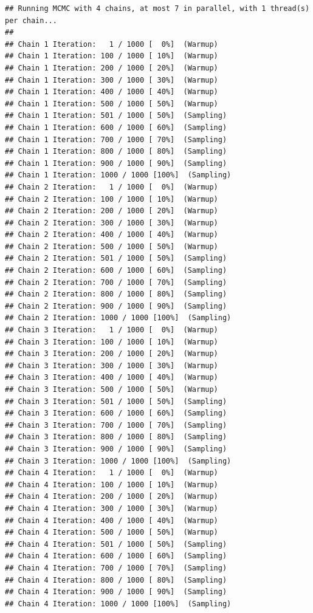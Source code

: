 \documentclass[
]{book}
\begin{document}
\begin{verbatim}
## Running MCMC with 4 chains, at most 7 in parallel, with 1 thread(s) per chain...
## 
## Chain 1 Iteration:   1 / 1000 [  0%]  (Warmup) 
## Chain 1 Iteration: 100 / 1000 [ 10%]  (Warmup) 
## Chain 1 Iteration: 200 / 1000 [ 20%]  (Warmup) 
## Chain 1 Iteration: 300 / 1000 [ 30%]  (Warmup) 
## Chain 1 Iteration: 400 / 1000 [ 40%]  (Warmup) 
## Chain 1 Iteration: 500 / 1000 [ 50%]  (Warmup) 
## Chain 1 Iteration: 501 / 1000 [ 50%]  (Sampling) 
## Chain 1 Iteration: 600 / 1000 [ 60%]  (Sampling) 
## Chain 1 Iteration: 700 / 1000 [ 70%]  (Sampling) 
## Chain 1 Iteration: 800 / 1000 [ 80%]  (Sampling) 
## Chain 1 Iteration: 900 / 1000 [ 90%]  (Sampling) 
## Chain 1 Iteration: 1000 / 1000 [100%]  (Sampling) 
## Chain 2 Iteration:   1 / 1000 [  0%]  (Warmup) 
## Chain 2 Iteration: 100 / 1000 [ 10%]  (Warmup) 
## Chain 2 Iteration: 200 / 1000 [ 20%]  (Warmup) 
## Chain 2 Iteration: 300 / 1000 [ 30%]  (Warmup) 
## Chain 2 Iteration: 400 / 1000 [ 40%]  (Warmup) 
## Chain 2 Iteration: 500 / 1000 [ 50%]  (Warmup) 
## Chain 2 Iteration: 501 / 1000 [ 50%]  (Sampling) 
## Chain 2 Iteration: 600 / 1000 [ 60%]  (Sampling) 
## Chain 2 Iteration: 700 / 1000 [ 70%]  (Sampling) 
## Chain 2 Iteration: 800 / 1000 [ 80%]  (Sampling) 
## Chain 2 Iteration: 900 / 1000 [ 90%]  (Sampling) 
## Chain 2 Iteration: 1000 / 1000 [100%]  (Sampling) 
## Chain 3 Iteration:   1 / 1000 [  0%]  (Warmup) 
## Chain 3 Iteration: 100 / 1000 [ 10%]  (Warmup) 
## Chain 3 Iteration: 200 / 1000 [ 20%]  (Warmup) 
## Chain 3 Iteration: 300 / 1000 [ 30%]  (Warmup) 
## Chain 3 Iteration: 400 / 1000 [ 40%]  (Warmup) 
## Chain 3 Iteration: 500 / 1000 [ 50%]  (Warmup) 
## Chain 3 Iteration: 501 / 1000 [ 50%]  (Sampling) 
## Chain 3 Iteration: 600 / 1000 [ 60%]  (Sampling) 
## Chain 3 Iteration: 700 / 1000 [ 70%]  (Sampling) 
## Chain 3 Iteration: 800 / 1000 [ 80%]  (Sampling) 
## Chain 3 Iteration: 900 / 1000 [ 90%]  (Sampling) 
## Chain 3 Iteration: 1000 / 1000 [100%]  (Sampling) 
## Chain 4 Iteration:   1 / 1000 [  0%]  (Warmup) 
## Chain 4 Iteration: 100 / 1000 [ 10%]  (Warmup) 
## Chain 4 Iteration: 200 / 1000 [ 20%]  (Warmup) 
## Chain 4 Iteration: 300 / 1000 [ 30%]  (Warmup) 
## Chain 4 Iteration: 400 / 1000 [ 40%]  (Warmup) 
## Chain 4 Iteration: 500 / 1000 [ 50%]  (Warmup) 
## Chain 4 Iteration: 501 / 1000 [ 50%]  (Sampling) 
## Chain 4 Iteration: 600 / 1000 [ 60%]  (Sampling) 
## Chain 4 Iteration: 700 / 1000 [ 70%]  (Sampling) 
## Chain 4 Iteration: 800 / 1000 [ 80%]  (Sampling) 
## Chain 4 Iteration: 900 / 1000 [ 90%]  (Sampling) 
## Chain 4 Iteration: 1000 / 1000 [100%]  (Sampling)
\end{verbatim}
\end{document}
